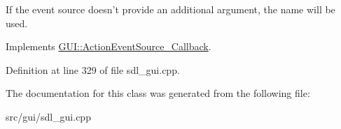If the event source doesn't provide an additional argument, the name will be used. 

Implements \hyperlink{structGUI_1_1ActionEventSource__Callback_a36df23a424558a83b45e3e3d5c175cf2}{G\-U\-I\-::\-Action\-Event\-Source\-\_\-\-Callback}.



Definition at line 329 of file sdl\-\_\-gui.\-cpp.



The documentation for this class was generated from the following file\-:\begin{DoxyCompactItemize}
\item 
src/gui/sdl\-\_\-gui.\-cpp\end{DoxyCompactItemize}
